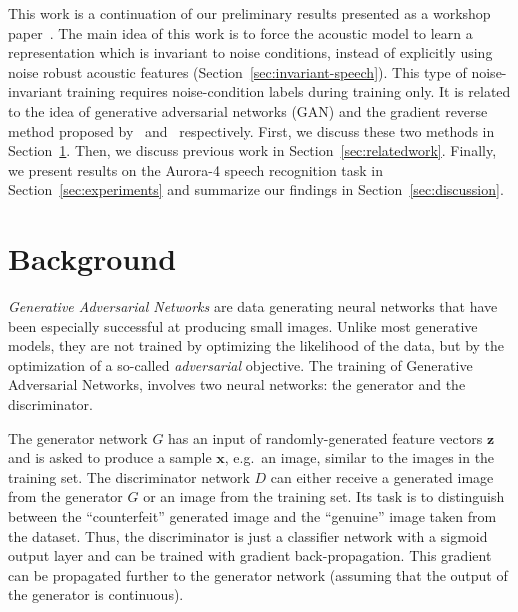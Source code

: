 \documentclass[a4paper]{article}
\begin{document}
    This work is a continuation of our preliminary results presented as a workshop 
    paper~\cite{serdyuk2016invariant}.
    The main idea of this work is to force the acoustic model 
    to learn a representation which is invariant to noise conditions, instead of 
    explicitly using noise robust acoustic features 
    (Section~\ref{sec:invariant-speech}). This type of noise-invariant 
    training requires noise-condition labels during training only. It is 
    related to the idea of generative adversarial networks (GAN) and the 
    gradient reverse method proposed by~\cite{goodfellow2014generative} 
    and~\cite{ganin2014unsupervised} respectively. 
    First, we discuss these two methods in Section~\ref{sec:background}.
    Then, we discuss previous work in Section~\ref{sec:relatedwork}. 
    Finally, we present results on the Aurora-4 speech 
    recognition task in Section~\ref{sec:experiments} and summarize 
    our findings in Section~\ref{sec:discussion}.

\section{Background}
\label{sec:background}
\emph{Generative Adversarial Networks} are data generating neural networks that
    have been especially successful at producing small images.
    Unlike most generative models, they are not trained by optimizing the
    likelihood of the data, but by the optimization of a so-called
    \emph{adversarial} objective. The training of Generative Adversarial
    Networks, involves two neural networks: the generator and the discriminator. 

    The generator network $G$ has an
    input of randomly-generated feature vectors $\bm{z}$ and is asked to produce a
    sample $\bm{x}$, e.g.\ an image, similar to the images in the training set. The discriminator network $D$
    can either receive a generated image from the generator $G$ or an image
    from the training set. Its task is to distinguish
    between the ``counterfeit'' generated image and the ``genuine'' image taken from the dataset. Thus,
    the discriminator is just a classifier network with a sigmoid output layer
    and can be trained with gradient back-propagation. This gradient can be propagated further
    to the generator network (assuming that the output of the generator is
    continuous).
\end{document}
